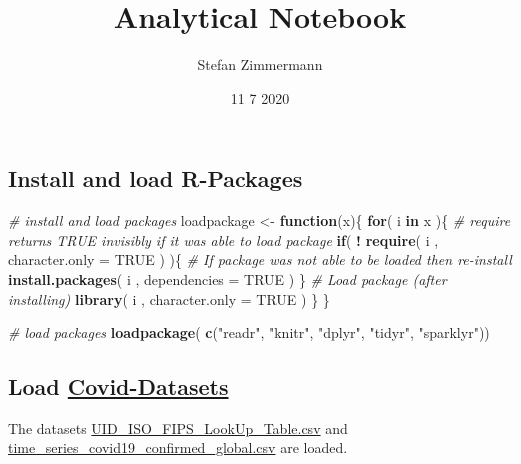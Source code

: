 \documentclass[]{article}
\title{Analytical Notebook}
\author{Stefan Zimmermann}
\date{11 7 2020}
\newenvironment{Shaded}{\begin{snugshade}}{\end{snugshade}}
\newcommand{\CommentTok}[1]{\textcolor[rgb]{0.56,0.35,0.01}{\textit{#1}}}
\newcommand{\ControlFlowTok}[1]{\textcolor[rgb]{0.13,0.29,0.53}{\textbf{#1}}}
\newcommand{\DataTypeTok}[1]{\textcolor[rgb]{0.13,0.29,0.53}{#1}}
\newcommand{\KeywordTok}[1]{\textcolor[rgb]{0.13,0.29,0.53}{\textbf{#1}}}
\newcommand{\NormalTok}[1]{#1}
\newcommand{\OperatorTok}[1]{\textcolor[rgb]{0.81,0.36,0.00}{\textbf{#1}}}
\newcommand{\OtherTok}[1]{\textcolor[rgb]{0.56,0.35,0.01}{#1}}
\newcommand{\StringTok}[1]{\textcolor[rgb]{0.31,0.60,0.02}{#1}}
\begin{document}
\maketitle

\hypertarget{install-and-load-r-packages}{%
\subsection{Install and load
R-Packages}\label{install-and-load-r-packages}}

\begin{Shaded}
\begin{Highlighting}[]
\CommentTok{# install and load packages}
\NormalTok{loadpackage <-}\StringTok{ }\ControlFlowTok{function}\NormalTok{(x)\{}
  \ControlFlowTok{for}\NormalTok{( i }\ControlFlowTok{in}\NormalTok{ x )\{}
    \CommentTok{#  require returns TRUE invisibly if it was able to load package}
    \ControlFlowTok{if}\NormalTok{( }\OperatorTok{!}\StringTok{ }\KeywordTok{require}\NormalTok{( i , }\DataTypeTok{character.only =} \OtherTok{TRUE}\NormalTok{ ) )\{}
      \CommentTok{#  If package was not able to be loaded then re-install}
      \KeywordTok{install.packages}\NormalTok{( i , }\DataTypeTok{dependencies =} \OtherTok{TRUE}\NormalTok{ )}
\NormalTok{    \}}
    \CommentTok{#  Load package (after installing)}
    \KeywordTok{library}\NormalTok{( i , }\DataTypeTok{character.only =} \OtherTok{TRUE}\NormalTok{ )}
\NormalTok{  \}}
\NormalTok{\}}

\CommentTok{# load packages}
\KeywordTok{loadpackage}\NormalTok{( }\KeywordTok{c}\NormalTok{(}\StringTok{"readr"}\NormalTok{, }\StringTok{"knitr"}\NormalTok{, }\StringTok{"dplyr"}\NormalTok{, }\StringTok{"tidyr"}\NormalTok{, }\StringTok{"sparklyr"}\NormalTok{))}
\end{Highlighting}
\end{Shaded}

\hypertarget{load-covid-datasets}{%
\subsection{\texorpdfstring{Load
\href{https://github.com/CSSEGISandData/COVID-19/tree/master/csse_covid_19_data}{Covid-Datasets}}{Load Covid-Datasets}}\label{load-covid-datasets}}

The datasets
\href{https://raw.githubusercontent.com/CSSEGISandData/COVID-19/master/csse_covid_19_data/UID_ISO_FIPS_LookUp_Table.csv}{UID\_ISO\_FIPS\_LookUp\_Table.csv}
and
\href{https://raw.githubusercontent.com/CSSEGISandData/COVID-19/master/csse_covid_19_data/csse_covid_19_time_series/time_series_covid19_confirmed_global.csv}{time\_series\_covid19\_confirmed\_global.csv}
are loaded.
\end{document}
